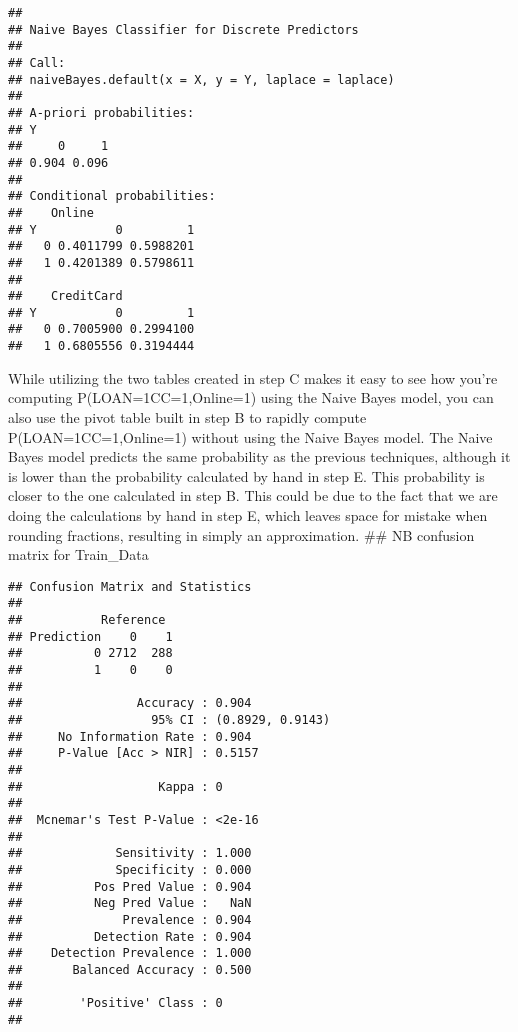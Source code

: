 \documentclass[
]{article}
\newenvironment{Shaded}{\begin{snugshade}}{\end{snugshade}}
\newcommand{\AttributeTok}[1]{\textcolor[rgb]{0.77,0.63,0.00}{#1}}
\newcommand{\FunctionTok}[1]{\textcolor[rgb]{0.00,0.00,0.00}{#1}}
\newcommand{\NormalTok}[1]{#1}
\newcommand{\OtherTok}[1]{\textcolor[rgb]{0.56,0.35,0.01}{#1}}
\newcommand{\SpecialCharTok}[1]{\textcolor[rgb]{0.00,0.00,0.00}{#1}}
\begin{document}
\begin{verbatim}
## 
## Naive Bayes Classifier for Discrete Predictors
## 
## Call:
## naiveBayes.default(x = X, y = Y, laplace = laplace)
## 
## A-priori probabilities:
## Y
##     0     1 
## 0.904 0.096 
## 
## Conditional probabilities:
##    Online
## Y           0         1
##   0 0.4011799 0.5988201
##   1 0.4201389 0.5798611
## 
##    CreditCard
## Y           0         1
##   0 0.7005900 0.2994100
##   1 0.6805556 0.3194444
\end{verbatim}

While utilizing the two tables created in step C makes it easy to see
how you're computing P(LOAN=1\textbar CC=1,Online=1) using the Naive
Bayes model, you can also use the pivot table built in step B to rapidly
compute P(LOAN=1\textbar CC=1,Online=1) without using the Naive Bayes
model. The Naive Bayes model predicts the same probability as the
previous techniques, although it is lower than the probability
calculated by hand in step E. This probability is closer to the one
calculated in step B. This could be due to the fact that we are doing
the calculations by hand in step E, which leaves space for mistake when
rounding fractions, resulting in simply an approximation. \#\# NB
confusion matrix for Train\_Data

\begin{Shaded}
\end{Shaded}

\begin{verbatim}
## Confusion Matrix and Statistics
## 
##           Reference
## Prediction    0    1
##          0 2712  288
##          1    0    0
##                                           
##                Accuracy : 0.904           
##                  95% CI : (0.8929, 0.9143)
##     No Information Rate : 0.904           
##     P-Value [Acc > NIR] : 0.5157          
##                                           
##                   Kappa : 0               
##                                           
##  Mcnemar's Test P-Value : <2e-16          
##                                           
##             Sensitivity : 1.000           
##             Specificity : 0.000           
##          Pos Pred Value : 0.904           
##          Neg Pred Value :   NaN           
##              Prevalence : 0.904           
##          Detection Rate : 0.904           
##    Detection Prevalence : 1.000           
##       Balanced Accuracy : 0.500           
##                                           
##        'Positive' Class : 0               
## 
\end{verbatim}
\end{document}

